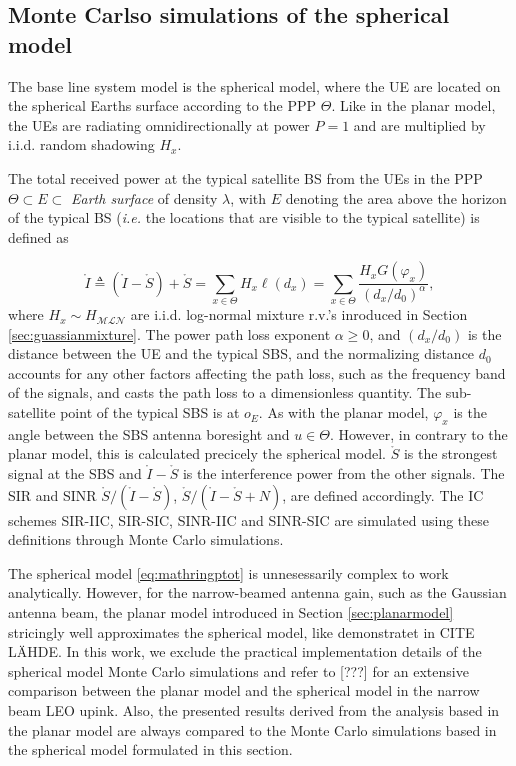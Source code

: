 \documentclass[lettersize,journal]{IEEEtran}
\begin{document}
\subsection{Monte Carlso simulations of the spherical model}
\label{sec:sphericalmodel}
The base line system model is the spherical model, where the UE are located on the spherical Earths surface according to the PPP $\Theta$. Like in the planar model, the UEs are radiating omnidirectionally at power $P=1$ and are multiplied by i.i.d. random shadowing $H_x$.

The total received power at the typical satellite BS from the UEs in the PPP $\Theta \subset E \subset$ \textit{Earth surface} of density $\lambda$, with $E$ denoting the area above the horizon of the typical BS (\textit{i.e.} the locations that are visible to the typical satellite) is defined as

\begin{equation}
  \label{eq:mathringptot}
  \mathring{I} \triangleq (\mathring{I}- \mathring{S}) + \mathring{S} =    \sum_{x \in \Theta} H_x\ell(d_x) = \sum_{x \in \Theta}  \frac{H_x G(\varphi_x)}{(d_x/d_0)^{\alpha}},
\end{equation}
where $H_{x} \sim H_{\mathcal{M}\mathcal{L}\mathcal{N}}$ are i.i.d. log-normal mixture r.v.'s inroduced in Section \ref{sec:guassianmixture}. The power path loss exponent $\alpha \geq 0$, and $(d_x/d_0)$ is the distance between the UE and the typical SBS, and the normalizing distance $d_0$ accounts for any other factors affecting the path loss, such as the frequency band of the signals, and casts the path loss to a dimensionless quantity. The sub-satellite point of the typical SBS is at $\textit{o}_E$. As with the planar model, $\varphi_x$ is the angle between the SBS antenna boresight and  $u \in \Theta$. However, in contrary to the planar model, this is calculated precicely the spherical model. $\mathring{S}$ is the strongest signal at the SBS and $\mathring{I}-\mathring{S}$ is the interference power from the other signals. The SIR and SINR $\mathring{S}/(\mathring{I}-\mathring{S})$,  $\mathring{S}/(\mathring{I}-\mathring{S}+N)$, are defined accordingly. The IC schemes SIR-IIC, SIR-SIC, SINR-IIC and SINR-SIC are simulated using these definitions through Monte Carlo simulations. 


The spherical model \eqref{eq:mathringptot} is unnesessarily complex to work analytically. However, for the narrow-beamed antenna gain, such as the Gaussian antenna beam, the planar model introduced in Section \ref{sec:planarmodel} stricingly well approximates the spherical model, like demonstratet in CITE LÄHDE. In this work, we exclude the practical implementation details of the spherical model Monte Carlo simulations and refer to [???] for an extensive comparison between the planar model and the spherical model in the narrow beam LEO upink. Also, the presented results derived from the analysis based in the planar model are always compared to the Monte Carlo simulations based in the spherical model formulated in this section.
\end{document}
